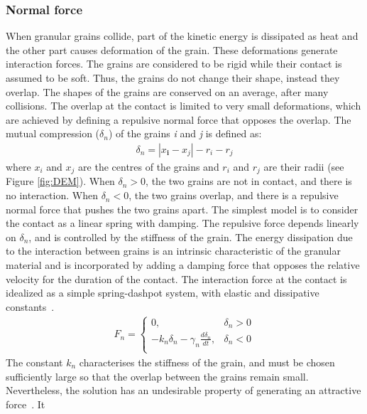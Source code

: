 \subsubsection*{Normal force}
When granular grains collide, part of the kinetic energy is dissipated as 
heat and the other 
part causes deformation of the grain. These deformations generate 
interaction forces. The 
grains 
are considered to be rigid while their contact is assumed to be soft. Thus, the 
grains do not 
change their shape, instead they overlap. The shapes of the grains are 
conserved on an average, 
after many collisions. The overlap at the contact is limited to very small 
deformations, which are 
achieved by defining a repulsive normal force that opposes the overlap. The 
mutual compression 
($\delta_{n}$) of the grains \textit{i} and \textit{j} is defined as:
\begin{align}
 \delta_{n}=\left|x_{\mathbf{i}}-x_{\mathit{j}}\right|-r_{i}-r_{j}
\label{eq:delta}
\end{align}
where $x_{\mathit{i}}$ and $x_{\mathit{j}}$ are the centres of the grains and  
$r_{\mathit{i}}$ 
and 
$r_{\mathit{j}}$ are their radii (see Figure \ref{fig:DEM}). When 
$\delta_{n}>0$, the two grains 
are not in contact, and there is no interaction. When $\delta_{n}<0$, the two 
grains overlap, and 
there 
is a repulsive normal force that pushes the two grains apart. The simplest 
model is to consider 
the 
contact as a linear spring with damping. The repulsive force depends linearly 
on $\delta_{n}$, and 
is controlled by the stiffness of the grain. The energy dissipation due to the 
interaction between 
grains is an intrinsic characteristic of the granular material and is 
incorporated by adding a 
damping force that opposes the relative velocity for the duration of the 
contact. The interaction 
force at the contact is idealized as a simple spring-dashpot system, with 
elastic and dissipative 
constants~\citep{Luding1994}. 
\begin{align}
 {{F}_{n}}=
\begin{cases}
0, & {{\delta}_{n}}>0 \\
-{{k}_{n}}{{\delta}_{n}}-{{\gamma}_{n}}\frac{d{{\delta}_{n}}}{dt}, & 
{{\delta}_{n}}<0 \\
\end{cases}
\end{align} 
The constant ${k}_{n}$ characterises the stiffness of the grain, and must be 
chosen sufficiently 
large so that the overlap between the grains remain small. Nevertheless, the 
solution has an 
undesirable property of generating an attractive force~\citep{Posch2005}. It 
